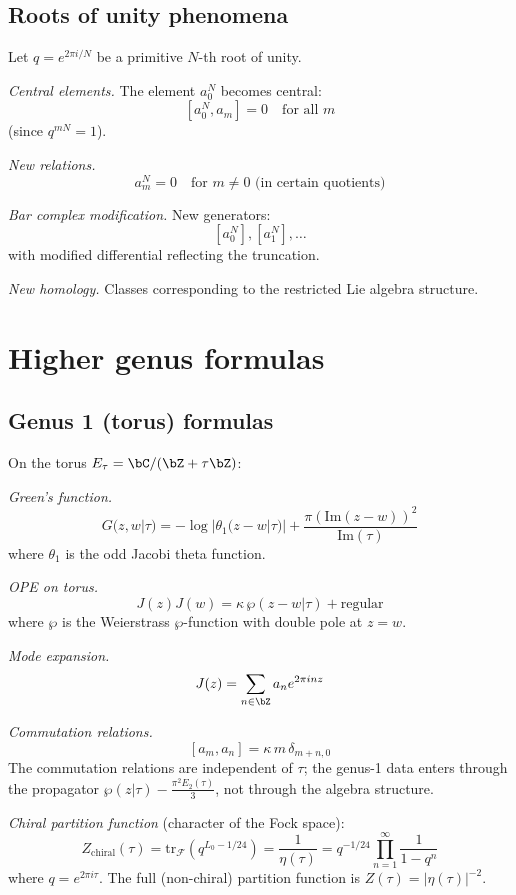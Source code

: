 \subsection{Roots of unity phenomena}

\begin{computation}\label{comp:q-root-unity}
Let $q = e^{2\pi i/N}$ be a primitive $N$-th root of unity.

\emph{Central elements.} The element $a_0^N$ becomes central:
\[
[a_0^N, a_m] = 0 \quad \text{for all } m
\]
(since $q^{mN} = 1$).

\emph{New relations.}
\[
a_m^N = 0 \quad \text{for } m \neq 0 \text{ (in certain quotients)}
\]

\emph{Bar complex modification.} New generators:
\[
[a_0^N], [a_1^N], \ldots
\]
with modified differential reflecting the truncation.

\emph{New homology.} Classes corresponding to the restricted Lie algebra structure.
\end{computation}


\section{Higher genus formulas}
\label{sec:higher-genus-details}

\subsection{Genus 1 (torus) formulas}

\begin{computation}\label{comp:heisenberg-torus}
On the torus $E_\tau = \bC/(\bZ + \tau\bZ)$:

\emph{Green's function.}
\[
G(z, w | \tau) = -\log|\theta_1(z-w|\tau)| + \frac{\pi(\mathrm{Im}(z-w))^2}{\mathrm{Im}(\tau)}
\]
where $\theta_1$ is the odd Jacobi theta function.

\emph{OPE on torus.}
\[
J(z) J(w) = \kappa\,\wp(z-w|\tau) + \text{regular}
\]
where $\wp$ is the Weierstrass $\wp$-function with double pole at $z = w$.

\emph{Mode expansion.}
\[
J(z) = \sum_{n \in \bZ} a_n e^{2\pi i n z}
\]

\emph{Commutation relations.}
\[
[a_m, a_n] = \kappa\, m\,\delta_{m+n,0}
\]
The commutation relations are independent of $\tau$; the genus-1 data enters through the propagator $\wp(z|\tau) - \frac{\pi^2 E_2(\tau)}{3}$, not through the algebra structure.

\emph{Chiral partition function} (character of the Fock space):
\[
Z_{\mathrm{chiral}}(\tau) = \mathrm{tr}_{\mathcal{F}}(q^{L_0 - 1/24}) = \frac{1}{\eta(\tau)} = q^{-1/24} \prod_{n=1}^\infty \frac{1}{1 - q^n}
\]
where $q = e^{2\pi i \tau}$.  The full (non-chiral) partition function is $Z(\tau) = |\eta(\tau)|^{-2}$.
\end{computation}


